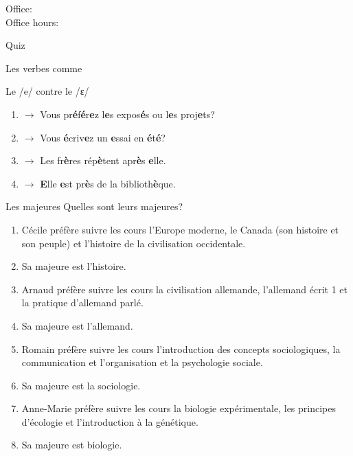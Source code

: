 \documentclass{beamer}
\subtitle[Études et verbes \lexi{préférer}]{Vos études et les verbes comme \lexi{préférer}}
\begin{document}
  \begin{frame}
    \titlepage
    \tiny{Office: \\
          Office hours: }
  \end{frame}

  \begin{frame}{}
    \begin{center}
      \Large Quiz
    \end{center}
  \end{frame}

  \begin{frame}{Les verbes comme }
    \begin{center}
      
    \end{center}
  \end{frame}

  \begin{frame}{Le /e/ contre le /ɛ/}
    \begin{enumerate}
      \item[/e/] $\to$ Vous pr\textbf{é}f\textbf{é}r\textbf{e}z l\textbf{e}s expos\textbf{é}s ou l\textbf{e}s proj\textbf{e}ts?
      \item[/e/] $\to$ Vous \textbf{é}criv\textbf{e}z un \textbf{e}ssai en \textbf{é}t\textbf{é}?
      \item[/ɛ/] $\to$ Les fr\textbf{è}res rép\textbf{è}tent apr\textbf{è}s \textbf{e}lle.
      \item[/ɛ/] $\to$ \textbf{E}lle \textbf{e}st pr\textbf{è}s de la biblioth\textbf{è}que.
    \end{enumerate}
  \end{frame}

  \begin{frame}{Les majeures}
    Quelles sont leurs majeures?
    \begin{enumerate}
      \item Cécile préfère suivre les cours l'Europe moderne, le Canada (son histoire et son peuple) et l'histoire de la civilisation occidentale.
      \item[$\to$]<2-> Sa majeure est l'histoire.
      \item<3-> Arnaud préfère suivre les cours la civilisation allemande, l'allemand écrit 1 et la pratique d'allemand parlé.
      \item[$\to$]<4-> Sa majeure est l'allemand.
      \item<5-> Romain préfère suivre les cours l'introduction des concepts sociologiques, la communication et l'organisation et la psychologie sociale.
      \item[$\to$]<6-> Sa majeure est la sociologie.
      \item<7-> Anne-Marie préfère suivre les cours la biologie expérimentale, les principes d'écologie et l'introduction à la génétique.
      \item[$\to$]<8-> Sa majeure est biologie.
    \end{enumerate}
  \end{frame}
\end{document}
